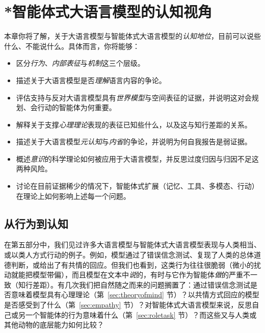 
\chapter{*智能体式大语言模型的认知视角}\label{chap:cognition}


\begin{learningbox}
本章你将了解，关于大语言模型与智能体式大语言模型的\emph{认知地位}，目前可以说些什么、不能说什么。具体而言，你将能够：
\begin{itemize}
    \item 区分\emph{行为}、\emph{内部表征}与\emph{机制}这三个层级。
    \item 描述关于大语言模型是否\emph{理解}语言内容的争论。
    \item 评估支持与反对大语言模型具有\emph{世界模型}与空间表征的证据，并说明这对会规划、会行动的智能体为何重要。
    \item 解释关于支撑\emph{心理理论}表现的表征已知些什么，以及这与知行差距的关系。
    \item 描述关于大语言模型\emph{元认知}与\emph{内省}的争论，并说明为何自我报告是弱证据。
    \item 概述\emph{意识}的科学理论如何被应用于大语言模型，并反思过度归因与归因不足这两种风险。
    \item 讨论在目前证据稀少的情况下，智能体式扩展（记忆、工具、多模态、行动）在理论上如何影响上述每一个问题。
\end{itemize}
\end{learningbox}

\section{从行为到认知}
在第五部分中，我们见过许多大语言模型与智能体式大语言模型表现与人类相当、或以类人方式行动的例子。例如，模型通过了错误信念测试、复现了人类的总体道德判断，或给出了有共情的回应。但我们也看到，这类行为往往很脆弱（微小的扰动就能把模型带偏），而且模型在文本中\emph{说}的，有时与它作为智能体\emph{做}的严重不一致（知行差距）。有几次我们把自然随之而来的问题搁置了：通过错误信念测试是否意味着模型具有心理理论（第~\ref{sec:theoryofmind} 节）？以共情方式回应的模型是否感受到了什么（第~\ref{sec:empathy} 节）？对智能体式大语言模型来说，反思自己或另一个智能体的行为意味着什么（第~\ref{sec:roletask} 节）？而这些又与人类或其他动物的底层能力如何比较？

